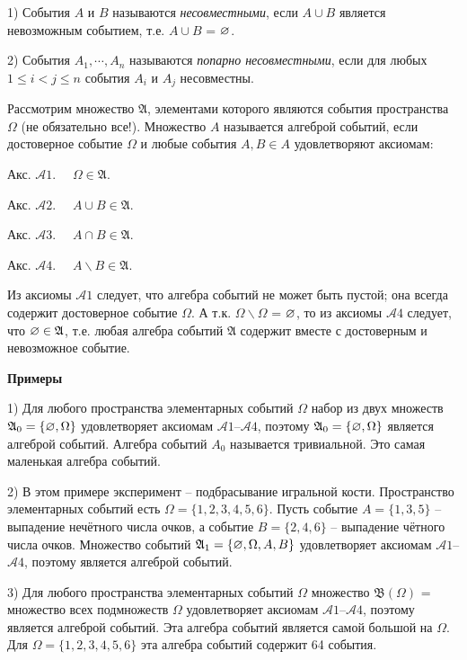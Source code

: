 \begin{definition}
1) События $A$ и $B$ называются \textit{несовместными}, если
$A\cup B$ является невозможным событием, т.е. $A\cup B$ = $\varnothing$.

2) События $A_1,\cdots,A_n$ называются \textit{попарно несовместными}, если для любых $1\leq i<j\leq n$ события $A_i$ и $A_j$ несовместны.
\end{definition}

\begin{definition}
Рассмотрим множество $\mathfrak{A}$, элементами которого являются события пространства $\Omega$ (не обязательно все!). Множество $A$ называется алгеброй событий, если достоверное событие $\Omega$ и любые события $A, B \in A$
удовлетворяют аксиомам:

Акс. $\mathcal{A}1$.$\quad$ $\Omega\in\mathfrak{A}$.

Акс. $\mathcal{A}2$.$\quad$ $A\cup B\in\mathfrak{A}$.

Акс. $\mathcal{A}3$.$\quad$ $A\cap B\in\mathfrak{A}$.

Акс. $\mathcal{A}4$.$\quad$ $A\backslash B\in\mathfrak{A}$.


Из аксиомы $\mathcal{A}1$ следует, что алгебра событий не может быть пустой; она всегда содержит достоверное событие $\Omega$. А т.к. $\Omega \backslash \Omega$ = $\varnothing$, то из аксиомы $\mathcal{A}4$ следует, что $\varnothing\in\mathfrak{A}$, т.е. любая алгебра событий $\mathfrak{A}$ содержит вместе с достоверным и невозможное событие.
\end{definition}

\textbf{Примеры}

1) Для любого пространства элементарных событий $\Omega$ набор из двух множеств $\mathfrak{A}_0=\{\varnothing,\Omega\}$ удовлетворяет аксиомам $\mathcal{A}1$--$\mathcal{A}4$, поэтому $\mathfrak{A}_0=\{\varnothing,\Omega\}$ является алгеброй событий. Алгебра событий $A_0$ называется тривиальной. Это самая маленькая алгебра событий.

2) В этом примере эксперимент -- подбрасывание игральной кости. 
Пространство элементарных событий есть $\Omega = \{1, 2, 3, 4, 5, 6\}$. 
Пусть событие $A = \{1, 3, 5\}$ -- выпадение нечётного числа очков, а событие $B= \{2, 4, 6\}$ -- выпадение чётного числа очков. 
Множество событий $\mathfrak{A}_1 = \{\varnothing, \Omega, A, B\}$ удовлетворяет аксиомам $\mathcal{A}1$--$\mathcal{A}4$, поэтому является алгеброй событий.

3) Для любого пространства элементарных событий $\Omega$ множество $\mathfrak{B}(\Omega)$ = множество всех подмножеств $\Omega$ удовлетворяет аксиомам $\mathcal{A}1$--$\mathcal{A}4$, поэтому является алгеброй событий. 
Эта алгебра событий является самой большой на $\Omega$. Для $\Omega= \{1, 2, 3, 4, 5, 6\}$ эта алгебра событий содержит 64 события.


